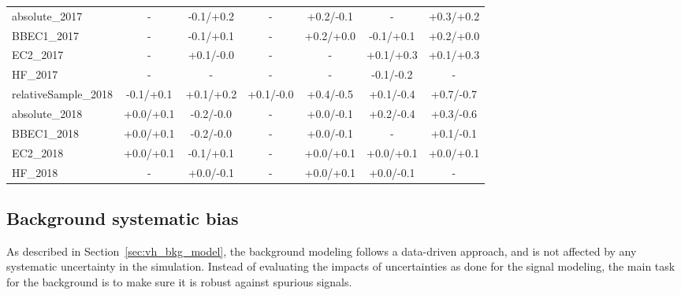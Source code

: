 \begin{table}[!htb]
{\begin{tabular}{l|c|c|c|c|c|c}
  absolute\_2017       & -           & -0.1/+0.2   & -           & +0.2/-0.1   & -           & +0.3/+0.2   \\   
  BBEC1\_2017          & -           & -0.1/+0.1   & -           & +0.2/+0.0   & -0.1/+0.1   & +0.2/+0.0   \\   
  EC2\_2017            & -           & +0.1/-0.0   & -           & -           & +0.1/+0.3   & +0.1/+0.3   \\   
  HF\_2017             & -           & -           & -           & -           & -0.1/-0.2   & -           \\   
  \hline
  relativeSample\_2018 & -0.1/+0.1   & +0.1/+0.2   & +0.1/-0.0   & +0.4/-0.5   & +0.1/-0.4   & +0.7/-0.7   \\
  absolute\_2018       & +0.0/+0.1   & -0.2/-0.0   & -           & +0.0/-0.1   & +0.2/-0.4   & +0.3/-0.6   \\   
  BBEC1\_2018          & +0.0/+0.1   & -0.2/-0.0   & -           & +0.0/-0.1   & -           & +0.1/-0.1   \\   
  EC2\_2018            & +0.0/+0.1   & -0.1/+0.1   & -           & +0.0/+0.1   & +0.0/+0.1   & +0.0/+0.1   \\   
  HF\_2018             & -           & +0.0/-0.1   & -           & +0.0/+0.1   & +0.0/-0.1   & -           \\   
  \hline

  \end{tabular}}
  \label{tab:vh_systematics_jec}
\end{table}


\clearpage
\subsection{Background systematic bias}\label{sec:bias_study}

As described in Section~\ref{sec:vh_bkg_model}, the background modeling follows a data-driven approach,
and is not affected by any systematic uncertainty in the simulation.
Instead of evaluating the impacts of uncertainties as done for the signal modeling, 
the main task for the background is to make sure it is robust against spurious signals.

